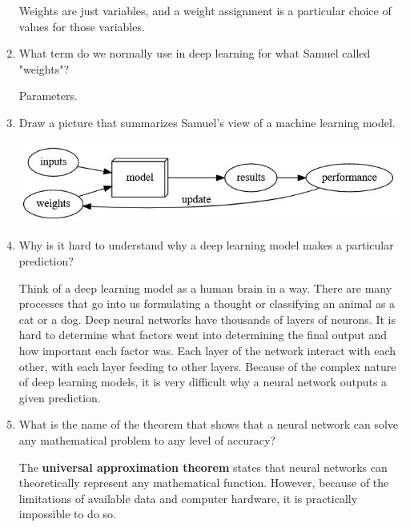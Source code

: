\documentclass[12pt,a4paper]{article}
\begin{document}
\begin{enumerate}
Weights are just variables, and a weight assignment is a particular choice of values for those variables.

\bigbreak

\item What term do we normally use in deep learning for what Samuel called "weights"? \\

\smallbreak

Parameters.

\bigbreak

\item Draw a picture that summarizes Samuel's view of a machine learning model. \\

\smallbreak

\includegraphics[scale=1]{model.jpeg}

\bigbreak

\item Why is it hard to understand why a deep learning model makes a particular prediction? \\

\smallbreak

Think of a deep learning model as a human brain in a way. There are many processes that go into us formulating a thought or classifying an animal as a cat or a dog. Deep neural networks have thousands of layers of neurons. It is hard to determine what factors went into determining the final output and how important each factor was. Each layer of the network interact with each other, with each layer feeding to other layers. Because of the complex nature of deep learning models, it is very difficult why a neural network outputs a given prediction.

\bigbreak

\item What is the name of the theorem that shows that a neural network can solve any mathematical problem to any level of accuracy? \\

\smallbreak

The \textbf{universal approximation theorem} states that neural networks can theoretically represent any mathematical function. However, because of the limitations of available data and computer hardware, it is practically impossible to do so.


\end{enumerate}
\end{document}
